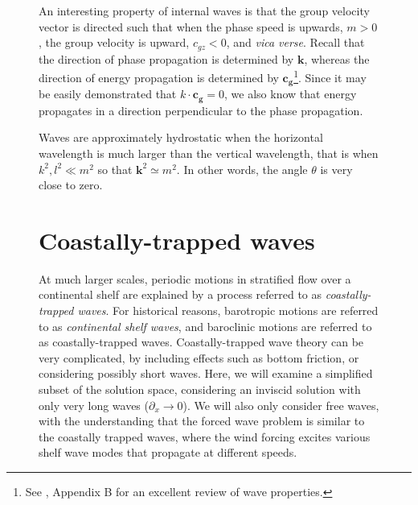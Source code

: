 \documentclass[11pt]{report}
\numberwithin{equation}{section}
\begin{document}
\begin{figure}
An interesting property of internal waves is that the group velocity vector is directed such that when the phase speed is upwards, $m>0$, the group velocity is upward, $c_{gz}<0$, and \emph{vica verse}.  Recall that the direction of phase propagation is determined by $\mathbf{k}$, whereas the direction of energy propagation is determined by $\mathbf{c_g}$\footnote{See \citet{cushman-roisin.beckers:11}, Appendix B for an excellent review of wave properties.}.  Since it may be easily demonstrated that $k\cdot\mathbf{c_g} = 0$, we also know that energy propagates in a direction perpendicular to the phase propagation.

Waves are approximately hydrostatic when the horizontal wavelength is much larger than the vertical wavelength, that is when $k^2, l^2 \ll m^2$ so that $\mathbf{k}^2 \simeq m^2$.  In other words, the angle $\theta$ is very close to zero.









\section{Coastally-trapped waves}

At much larger scales, periodic motions in stratified flow over a continental shelf are explained by a process referred to as \emph{coastally-trapped waves}.  For historical reasons, barotropic motions are referred to as \emph{continental shelf waves}, and baroclinic motions are referred to as coastally-trapped waves.  Coastally-trapped wave theory can be very complicated, by including effects such as bottom friction, or considering possibly short waves.  Here, we will examine a simplified subset of the solution space, considering an inviscid solution with only very long waves ($\partial_x \rightarrow 0$).  We will also only consider free waves, with the understanding that the forced wave problem is similar to the coastally trapped waves, where the wind forcing excites various shelf wave modes that propagate at different speeds.


\end{figure}
\end{document}
